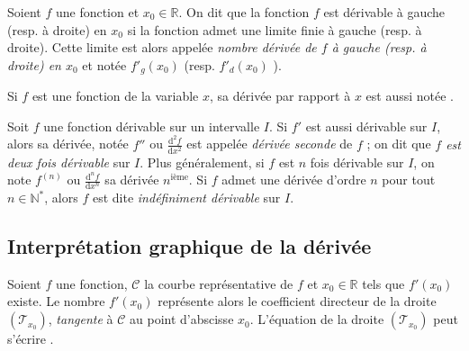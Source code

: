       \begin{defi}
            Soient $f$ une fonction et $x_0 \in \mathbb{R}$.
            On dit que la fonction $f$ est d\'erivable \`a gauche (resp. \`a droite) en $x_0$ si la fonction 
            admet une limite finie \`a gauche (resp. \`a droite).
            Cette limite est alors appel\'ee \emph{nombre d\'eriv\'ee de $f$ \`a gauche (resp. \`a droite) en $x_0$}
            et not\'ee $f'_g (x_0)$ (resp. $f'_d (x_0)$ ).
            
            Si $f$ est une fonction de la variable $x$, sa d\'eriv\'ee par rapport \`a $x$ est aussi not\'ee 
                  .
            
      \end{defi}
      
      \begin{defi}
            Soit $f$ une fonction d\'erivable sur un intervalle $I$.
            Si $f'$ est aussi d\'erivable sur $I$, alors sa d\'eriv\'ee, 
            not\'ee $f''$ ou $\frac{\mathrm{d}^2f}{\mathrm{d}x^2}$ est appel\'ee
            \emph{d\'eriv\'ee seconde} de $f$ ; on dit que \emph{$f$ est deux fois d\'erivable} sur $I$.
            Plus g\'en\'eralement, si $f$ est $n$ fois d\'erivable sur $I$, 
            on note $f^{(n)}$ ou $\frac{\mathrm{d}^nf}{\mathrm{d}x^n}$
            sa d\'eriv\'ee $n^{\text{i\`eme}}$.
            Si $f$ admet une d\'eriv\'ee d'ordre $n$ pour tout $n\in \mathbb{N}^*$, alors $f$ est dite
            \emph{ind\'efiniment d\'erivable} sur $I$.
      \end{defi}
            
      \subsection{Interpr\'etation graphique de la d\'eriv\'ee}
            Soient $f$ une fonction, 
            $\mathscr{C}$ la courbe repr\'esentative de $f$ 
            et $x_0\in \mathbb{R}$
            tels que $f'(x_0)$ existe.
            Le nombre $f'(x_0)$ repr\'esente alors 
            le coefficient directeur de la droite $(\mathscr{T}_{x_0})$, 
            \emph{tangente} \`a $\mathscr{C}$ au point d'abscisse $x_0$.
            L'\'equation de la droite $(\mathscr{T}_{x_0})$ peut s'\'ecrire
            .

